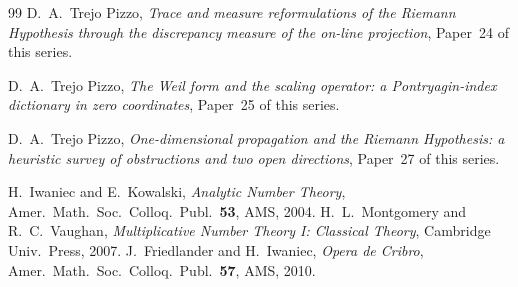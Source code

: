 \documentclass[11pt]{amsart}
\theoremstyle{definition}
\theoremstyle{remark}
\begin{document}
\begin{thebibliography}{99}
 D.~A.~Trejo Pizzo, \emph{Trace and measure reformulations of the Riemann
Hypothesis through the discrepancy measure of the on-line projection}, Paper~24 of this series.

 D.~A.~Trejo Pizzo, \emph{The Weil form and the scaling operator: a
Pontryagin-index dictionary in zero coordinates}, Paper~25 of this series.

 D.~A.~Trejo Pizzo, \emph{One-dimensional propagation and the Riemann
Hypothesis: a heuristic survey of obstructions and two open directions}, Paper~27 of this
series.

 H.~Iwaniec and E.~Kowalski, \emph{Analytic Number Theory}, Amer.\ Math.\ Soc.\ Colloq.\ Publ.\ \textbf{53}, AMS, 2004.
 H.~L.~Montgomery and R.~C.~Vaughan, \emph{Multiplicative Number Theory I: Classical Theory}, Cambridge Univ.\ Press, 2007.
 J.~Friedlander and H.~Iwaniec, \emph{Opera de Cribro}, Amer.\ Math.\ Soc.\ Colloq.\ Publ.\ \textbf{57}, AMS, 2010.
\end{thebibliography}
\end{document}
